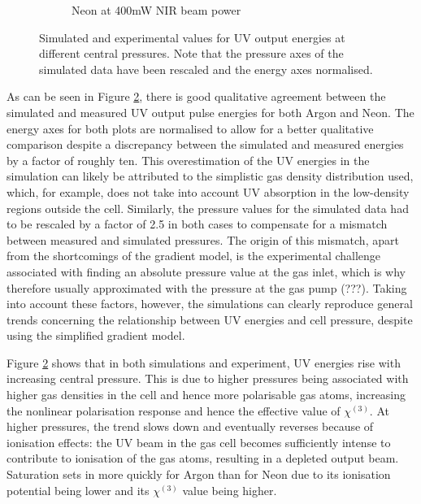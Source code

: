 \documentclass[a4paper]{jpconf}
\begin{document}
\begin{figure}[h]
\begin{subfigure}{0.5\textwidth}
\caption{Neon at 400mW NIR beam power}\label{im:sim_v_measured_Ne}
\end{subfigure}
\caption{Simulated and experimental values for UV output energies at different central pressures. Note that the pressure axes of the simulated data have been rescaled and the energy axes normalised.}\label{im:sim_v_measured}
\end{figure}
As can be seen in Figure \ref{im:sim_v_measured}, there is good qualitative agreement between the simulated and measured UV output pulse energies for both Argon and Neon. The energy axes for both plots are normalised to allow for a better qualitative comparison despite a discrepancy between the simulated and measured energies by a factor of roughly ten. This overestimation of the UV energies in the simulation can likely be attributed to the simplistic gas density distribution used, which, for example, does not take into account UV absorption in the low-density regions outside the cell. Similarly, the pressure values for the simulated data had to be rescaled by a factor of 2.5 in both cases to compensate for a mismatch between measured and simulated pressures. The origin of this mismatch, apart from the shortcomings of the gradient model, is the experimental challenge associated with finding an absolute pressure value at the gas inlet, which is why therefore usually approximated with the pressure at the gas pump (???). Taking into account these factors, however, the simulations can clearly reproduce general trends concerning the relationship between UV energies and cell pressure, despite using the simplified gradient model. \par 
Figure \ref{im:sim_v_measured} shows that in both simulations and experiment, UV energies rise with increasing central pressure. This is due to higher pressures being associated with higher gas densities in the cell and hence more polarisable gas atoms, increasing the nonlinear polarisation response and hence the effective value of $\chi^{(3)}$. At higher pressures, the trend slows down and eventually reverses because of ionisation effects: the UV beam in the gas cell becomes sufficiently intense to contribute to ionisation of the gas atoms, resulting in a depleted output beam. Saturation sets in more quickly for Argon than for Neon due to its ionisation potential being lower and its $\chi^{(3)}$ value being higher. \par 
\end{document}
